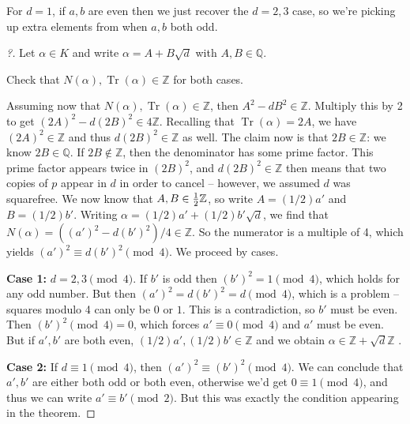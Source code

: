 \begin{remark}

For \(d=1\), if \(a, b\) are even then we just recover the \(d=2,3\)
case, so we're picking up extra elements from when \(a,b\) both odd.

\end{remark}

\begin{proof}[?]

Let \(\alpha\in K\) and write \(\alpha = A + B \sqrt{d}\) with
\(A, B\in {\mathbb{Q}}\).

\begin{exercise}[?]

Check that \(N( \alpha), \operatorname{Tr}( \alpha) \in {\mathbb{Z}}\)
for both cases.

\end{exercise}

Assuming now that
\(N( \alpha), \operatorname{Tr}( \alpha) \in {\mathbb{Z}}\), then
\(A^2 - dB^2 \in {\mathbb{Z}}\). Multiply this by 2 to get
\((2A)^2 - d(2B)^2 \in 4{\mathbb{Z}}\). Recalling that
\(\operatorname{Tr}( \alpha) = 2 A\), we have
\((2A)^2 \in {\mathbb{Z}}\) and thus \(d(2B)^2 \in {\mathbb{Z}}\) as
well. The claim now is that \(2B \in {\mathbb{Z}}\): we know
\(2B\in {\mathbb{Q}}\). If \(2B\not\in {\mathbb{Z}}\), then the
denominator has some prime factor. This prime factor appears twice in
\((2B)^2\), and \(d(2B)^2 \in {\mathbb{Z}}\) then means that two copies
of \(p\) appear in \(d\) in order to cancel -- however, we assumed \(d\)
was squarefree. We now know that \(A, B \in {1\over 2}{\mathbb{Z}}\), so
write \(A = (1/2)a'\) and \(B = (1/2)b'\). Writing
\(\alpha= (1/2)a' + (1/2)b' \sqrt{d}\), we find that
\(N( \alpha) = ((a')^2 - d(b')^2) / 4 \in {\mathbb{Z}}\). So the
numerator is a multiple of 4, which yields
\((a')^2 \equiv d(b')^2 \pmod 4\). We proceed by cases.

\textbf{Case 1:} \(d = 2,3 \pmod 4\). If \(b'\) is odd then
\((b')^2 = 1\pmod 4\), which holds for any odd number. But then
\((a')^2 = d(b')^2 = d \pmod 4\), which is a problem -- squares modulo 4
can only be \(0\) or \(1\). This is a contradiction, so \(b'\) must be
even. Then \((b')^2 \pmod 4 = 0\), which forces \(a' \equiv 0 \pmod 4\)
and \(a'\) must be even. But if \(a', b'\) are both even,
\((1/2)a', (1/2)b'\in {\mathbb{Z}}\) and we obtain
\(\alpha\in {\mathbb{Z}}+ \sqrt{d} {\mathbb{Z}}\) .

\textbf{Case 2:} If \(d\equiv 1 \pmod 4\), then
\((a')^2 \equiv (b')^2 \pmod 4\). We can conclude that \(a', b'\) are
either both odd or both even, otherwise we'd get \(0\equiv 1 \pmod 4\),
and thus we can write \(a' \equiv b' \pmod 2\). But this was exactly the
condition appearing in the theorem.

\end{proof}

